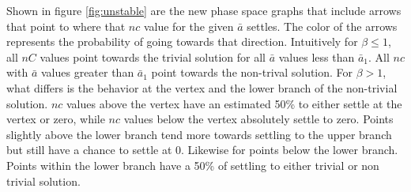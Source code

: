 Shown in figure \ref{fig:unstable} are the new phase space graphs that include arrows that point to where that $n{c}$ value for the given $\bar{a}$ settles.
The color of the arrows represents the probability of going towards that direction.
Intuitively for $\beta \leq 1$, all $nC$ values point towards the trivial solution for all $\bar{a}$ values less than  $\bar{a}_{1}$. 
All $n{c}$ with $\bar{a}$ values greater than $\bar{a}_{1}$ point towards the non-trival solution.
For $\beta > 1$, what differs is the behavior at the vertex and the lower branch of the non-trivial solution.
$n{c}$ values above the vertex have an estimated 50\% to either settle at the vertex or zero, while $n{c}$ values below the vertex absolutely settle to zero.
Points slightly above the lower branch tend more towards settling to the upper branch but still have a chance to settle at 0.
Likewise for points below the lower branch.
Points within the lower branch have a 50\% of settling to either trivial or non trivial solution.












